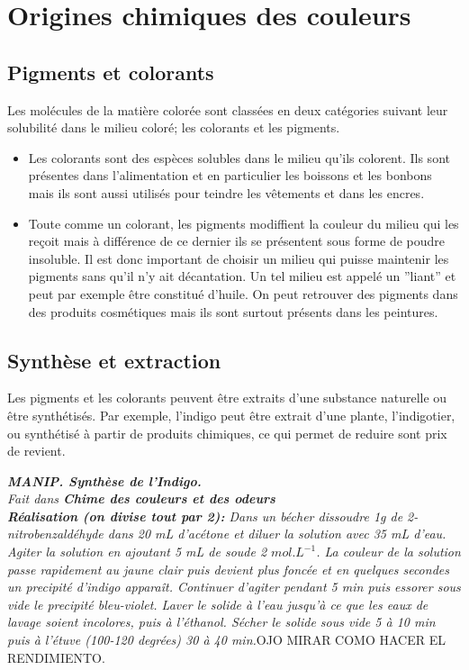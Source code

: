 \documentclass{article}
\begin{document}
\section{Origines chimiques des couleurs}
\subsection{Pigments et colorants}
Les molécules de la matière colorée sont classées en deux catégories suivant leur solubilité dans le milieu coloré; les colorants et les pigments.
\begin{itemize}
    \item Les colorants sont des espèces solubles dans le milieu qu'ils colorent. Ils sont présentes dans l'alimentation et en particulier les boissons et les bonbons mais ils sont aussi utilisés pour teindre les vêtements et dans les encres. 
    
    \item Toute comme un colorant, les pigments modiffient la couleur du milieu qui les reçoit mais à différence de ce dernier ils se présentent sous forme de poudre insoluble. Il est donc important de choisir un milieu qui puisse maintenir les pigments sans qu'il n'y ait décantation. Un tel milieu est appelé un ”liant” et peut par exemple être constitué d’huile. On peut retrouver des pigments dans des produits cosmétiques mais ils sont surtout présents dans les peintures.
\end{itemize}

\subsection{Synthèse et extraction}
Les pigments et les colorants peuvent être extraits d'une substance naturelle ou être synthétisés. Par exemple, l'indigo peut être extrait d'une plante, l'indigotier, ou synthétisé à partir de produits chimiques, ce qui permet de reduire sont prix de revient.\medskip

\textit{\textbf{MANIP. Synthèse de l'Indigo.}\\
Fait dans \textbf{Chime des couleurs et des odeurs}\\	
 \textbf{Réalisation (on divise tout par 2):} Dans un bécher dissoudre 1g de 2-nitrobenzaldéhyde dans 20 mL d'acétone et diluer la solution avec 35 mL d'eau. Agiter la solution en ajoutant 5 mL de soude 2 $mol.L^{-1}$. La couleur de la solution passe rapidement au jaune clair puis devient plus foncée et en quelques secondes un precipité d'indigo apparaît. Continuer d'agiter pendant 5 min puis essorer sous vide le precipité bleu-violet. Laver le solide à l'eau jusqu'à ce que les eaux de lavage soient incolores, puis à l'éthanol. Sécher le solide sous vide 5 à 10 min puis à l'étuve (100-120 degrées) 30 à 40 min.}OJO MIRAR COMO HACER EL RENDIMIENTO.\medskip
\end{document}
